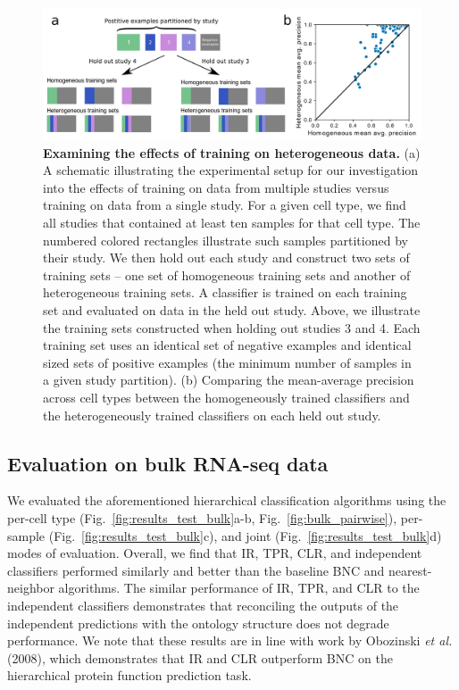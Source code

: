   \begin{figure}[h!]
  \centerline{\includegraphics[width=13cm]{figures/homo_vs_hetero_full.pdf}}
  \caption{
     \textbf{Examining the effects of training on heterogeneous data.} (a) A schematic illustrating the experimental setup for our investigation into the effects of training on data from multiple studies versus training on data from a single study.  For a given cell type, we find all studies that contained at least ten samples for that cell type. The numbered colored rectangles illustrate such samples partitioned by their study. We then hold out each study and construct two sets of training sets -- one set of homogeneous training sets and another of heterogeneous training sets.  A classifier is trained on each training set and evaluated on data in the held out study. Above, we illustrate the training sets constructed when holding out studies 3 and 4. Each training set uses an identical set of negative examples and identical sized sets of positive examples (the minimum number of samples in a given study partition). (b) Comparing the mean-average precision across cell types between the homogeneously trained classifiers and the heterogeneously trained classifiers on each held out study.}
      \label{fig:homo_vs_hetero_setup}
      \end{figure}


\subsection*{Evaluation on bulk RNA-seq data}

We evaluated the aforementioned hierarchical classification algorithms using the per-cell type (Fig.~\ref{fig:results_test_bulk}a-b, Fig.~\ref{fig:bulk_pairwise}), per-sample (Fig.~\ref{fig:results_test_bulk}c), and joint (Fig.~\ref{fig:results_test_bulk}d) modes of evaluation.  Overall, we find that IR, TPR, CLR, and independent classifiers performed similarly and better than the baseline BNC and nearest-neighbor algorithms. The similar performance of IR, TPR, and CLR to the independent classifiers demonstrates that reconciling the outputs of the independent predictions with the ontology structure does not degrade performance.  We note that these results are in line with work by Obozinski \textit{et al.} (2008), which demonstrates that IR and CLR outperform BNC on the hierarchical protein function prediction task.

